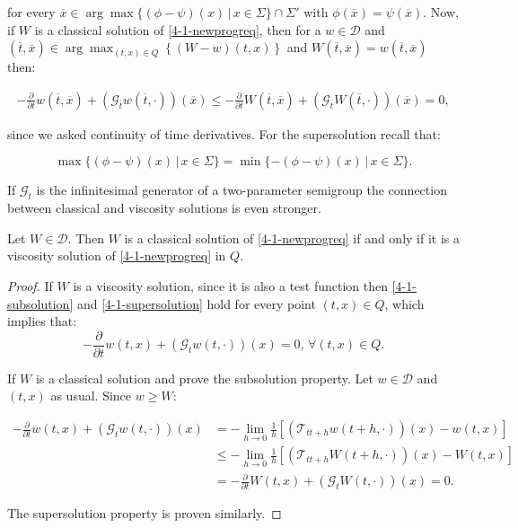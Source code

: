 for every $\overline{x}\in\arg \max \{(\phi-\psi)(x)\,|\,x\in\Sigma\}\cap\Sigma'$ with $\phi(\overline{x})=\psi(\overline{x})$. Now,
if $W$ is a classical solution of \ref{4-1-newprogreq}, then for a $w\in\mathcal{D}$ and $\left(\overline{t},\overline{x}\right) \in \arg \max_{(t,x)\in Q}\left\{(W-w)(t,x)\right\}$ 
and $W\left(\overline{t},\overline{x}\right)=w\left(\overline{t},\overline{x}\right)$ then:

\begin{align}
    -\frac{\partial}{\partial t}w\left(\overline{t},\overline{x}\right) + \left(\mathcal{G}_{\overline{t}}w\left(\overline{t},\cdot\right)\right)\left(\overline{x}\right) \leq -\frac{\partial}{\partial t}W\left(\overline{t},\overline{x}\right) + \left(\mathcal{G}_{\overline{t}}W\left(\overline{t},\cdot\right)\right)\left(\overline{x}\right) = 0,
\end{align}

since we asked continuity of time derivatives. For the supersolution recall that:

\[ \max \{(\phi-\psi)(x)\,|\,x\in \Sigma\} = \min \{-(\phi-\psi)(x)\,|\,x\in \Sigma\}.\]

If $\mathcal{G}_t$ is the infinitesimal generator of a two-parameter semigroup the connection between classical and viscosity solutions is even stronger.

\begin{proposition}
    Let $W\in\mathcal{D}$. Then $W$ is a classical solution of \ref{4-1-newprogreq} if and only if it is a viscosity solution of \ref{4-1-newprogreq} in $Q$.

    \begin{proof}
        If $W$ is a viscosity solution, since it is also a test function then \ref{4-1-subsolution} and \ref{4-1-supersolution} hold for every point $(t,x)\in Q$, 
        which implies that:
        \[-\frac{\partial}{\partial t}w(t,x) + \left(\mathcal{G}_tw(t,\cdot)\right)(x) = 0,\,\forall(t,x)\in Q.\] 

        If $W$ is a classical solution and prove the subsolution property. Let $w\in\mathcal{D}$ and $(t,x)$ as usual. Since $w\geq W$:

        \begin{align*}
            -\frac{\partial}{\partial t}w(t,x) + (\mathcal{G}_tw(t,\cdot))(x) & = - \lim_{h\to0} \frac{1}{h}\left[(\mathcal{T}_{tt+h}w(t+h,\cdot))(x)-w(t,x)\right] \\
            & \leq - \lim_{h\to0} \frac{1}{h}\left[(\mathcal{T}_{tt+h}W(t+h,\cdot))(x)-W(t,x)\right] \\
            & = -\frac{\partial}{\partial t}W(t,x) + (\mathcal{G}_tW(t,\cdot))(x) = 0.
        \end{align*}

        The supersolution property is proven similarly.
    \end{proof}
\end{proposition}

